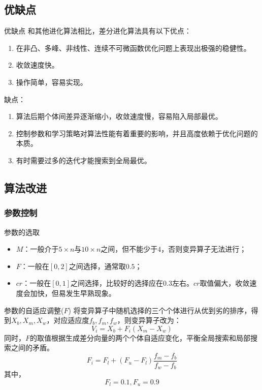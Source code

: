 \subsection{优缺点}
\begin{frame}{优缺点}
和其他进化算法相比，差分进化算法具有以下优点：
	\begin{enumerate}
		\item 在非凸、多峰、非线性、连续不可微函数优化问题上表现出极强的稳健性。
		\item 收敛速度快。
		\item 操作简单，容易实现。
	\end{enumerate}
	缺点：
	\begin{enumerate}
		\item 算法后期个体间差异逐渐缩小，收敛速度慢，容易陷入局部最优。
		\item 控制参数和学习策略对算法性能有着重要的影响，并且高度依赖于优化问题的本质。
		\item 有时需要过多的迭代才能搜索到全局最优。
	\end{enumerate}
\end{frame}


\subsection{算法改进}
\subsubsection{参数控制}

\begin{frame}{参数的选取}
	\begin{itemize}
		\item $M$：一般介于$5\times n$与$10\times n$之间，但不能少于$4$，否则变异算子无法进行；
		\item $F$：一般在$[0,2]$之间选择，通常取$0.5$；
		\item $cr$：一般在$[0,1]$之间选择，比较好的选择应在$0.3$左右。$cr$取值偏大，收敛速度会加快，但易发生早熟现象。
	\end{itemize}
\end{frame}

\begin{frame}{参数的自适应调整($F$)}
	将变异算子中随机选择的三个个体进行从优到劣的排序，得到$X_b,X_m,X_w$，对应适应度$f_b,f_m,f_w$，则变异算子改为：
	$$V_i=X_b+F_i\left(X_m-X_w\right)$$
	同时，$F$的取值根据生成差分向量的两个个体自适应变化，平衡全局搜索和局部搜索之间的矛盾。
	$$F_i = F_l +\left(F_u-F_l\right)\frac{f_m-f_b}{f_w-f_b}$$
	其中，$$F_l=0.1,F_u=0.9$$
\end{frame}

